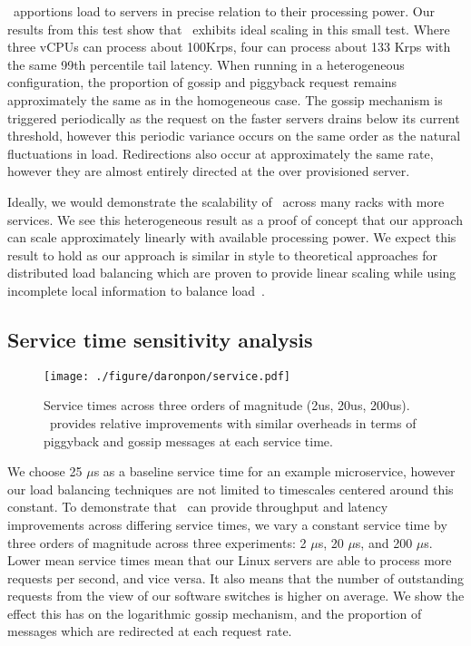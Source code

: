 \toolname\ apportions load to servers in precise relation to their processing
power. Our results from this test show that \toolname\ exhibits ideal scaling
in this small test. Where three vCPUs can process about 100Krps, four can
process about 133 Krps with the same 99th percentile tail latency. When running
in a heterogeneous configuration, the proportion of gossip and piggyback
request remains approximately the same as in the homogeneous case. The gossip
mechanism is triggered periodically as the request on the faster servers drains
below its current threshold, however this periodic variance occurs on the same
order as the natural fluctuations in load. Redirections also occur at
approximately the same rate, however they are almost entirely directed at the
over provisioned server.

Ideally, we would demonstrate the scalability of \toolname\ across many racks
with more services. We see this heterogeneous result as a proof of concept that
our approach can scale approximately linearly with available processing power.
We expect this result to hold as our approach is similar in style to
theoretical approaches for distributed load balancing which are proven to
provide linear scaling while using incomplete local information to balance
load~\cite{lsq}.

\subsection{Service time sensitivity analysis}
\label{sec:service_time}

\label{sec:service}
\begin{figure*}
  \texttt{[image: ./figure/daronpon/service.pdf]}

    \caption{Service times across three orders of magnitude (2us, 20us,
    200us). \toolname\ provides relative improvements with similar
    overheads in terms of piggyback and gossip messages at each
    service time. 
    }

  \label{fig:service}
\end{figure*}

We choose 25 $\mu$s as a baseline service time for an example microservice,
however our load balancing techniques are not limited to timescales centered
around this constant. To demonstrate that \toolname\ can provide throughput and
latency improvements across differing service times, we vary a constant service
time by three orders of magnitude across three experiments: 2 $\mu$s, 20
$\mu$s, and 200 $\mu$s.  Lower mean service times mean that our Linux servers
are able to process more requests per second, and vice versa.  It also means
that the number of outstanding requests from the view of our software switches
is higher on average.  We show the effect this has on the logarithmic gossip
mechanism, and the proportion of messages which are redirected at each request
rate.

